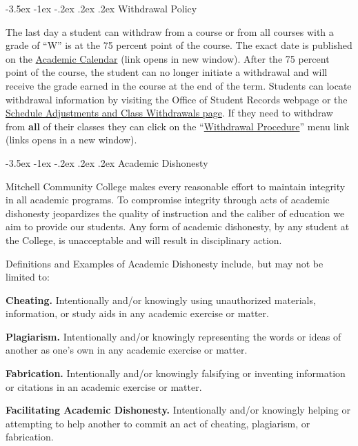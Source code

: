 \documentclass[11pt]{article}
\makeatletter
\renewcommand\section{\@startsection{section}{1}{0pt}%
  {-3.5ex \@plus -1ex \@minus -.2ex}%
  {.2ex \@plus.2ex}%
  {\normalfont\Large\bfseries}} %
\makeatother
\begin{document}
\section{Withdrawal Policy}

The last day a student can withdraw from a course or from all courses with a grade of ``W'' is at the 75 percent point of the course. The exact date is published on the \href{https://www.mitchellcc.edu/wp-content/uploads/2024/05/2024-2025-Academic-Calendar.pdf}{Academic Calendar} (link opens in new window). After the 75 percent point of the course, the student can no longer initiate a withdrawal and will receive the grade earned in the course at the end of the term. Students can locate withdrawal information by visiting the Office of Student Records webpage or the \href{https://www.mitchellcc.edu/schedule-adjustments-and-class-withdrawals/}{Schedule Adjustments and Class Withdrawals page}. If they need to withdraw from \textbf{all} of their classes they can click on the ``\href{https://mitchellcc.edu/withdrawal-procedure}{Withdrawal Procedure}'' menu link (links opens in a new window).

\section{Academic Dishonesty}

Mitchell Community College makes every reasonable effort to maintain integrity in all academic programs. To compromise integrity through acts of academic dishonesty jeopardizes the quality of instruction and the caliber of education we aim to provide our students.  Any form of academic dishonesty, by any student at the College, is unacceptable and will result in disciplinary action.

Definitions and Examples of Academic Dishonesty include, but may not be limited to:

\textbf{Cheating.} Intentionally and/or knowingly using unauthorized materials, information, or study aids in any academic exercise or matter.

\textbf{Plagiarism.} Intentionally and/or knowingly representing the words or ideas of another as one's own in any academic exercise or matter.

\textbf{Fabrication.} Intentionally and/or knowingly falsifying or inventing information or citations in an academic exercise or matter.

\textbf{Facilitating Academic Dishonesty.} Intentionally and/or knowingly helping or attempting to help another to commit an act of cheating, plagiarism, or fabrication.
\end{document}
